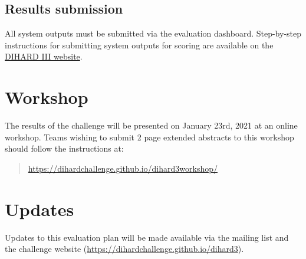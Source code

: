 \documentclass{article}
\begin{document}
\subsection{Results submission}
All system outputs must be submitted via the evaluation dashboard. Step-by-step instructions for submitting system outputs for scoring are available on  the \href{https://dihardchallenge.github.io/dihard3/submission.html}{DIHARD III website}.


\section{Workshop}
The results of the challenge will be presented on January 23rd, 2021 at an online workshop. Teams wishing to submit 2 page extended abstracts to this workshop should follow the instructions at:
%
    \begin{quote}
        \url{https://dihardchallenge.github.io/dihard3workshop/}
    \end{quote}
%



\section{Updates}
Updates to this evaluation plan will be made available via the mailing list and the challenge website (\url{https://dihardchallenge.github.io/dihard3}).
\end{document}
